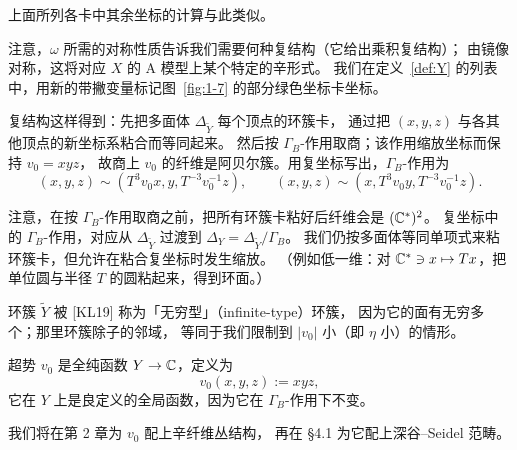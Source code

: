 上面所列各卡中其余坐标的计算与此类似。

\begin{remark}\label{rem:symmetry-told-structure}
注意，$\omega$ 所需的对称性质告诉我们需要何种复结构（它给出乘积复结构）；
由镜像对称，这将对应 $X$ 的 A 模型上某个特定的辛形式。
我们在定义~\ref{def:Y} 的列表中，用新的带撇变量标记图~\ref{fig:1-7} 的部分绿色坐标卡坐标。
\end{remark}

\begin{corollary}[{$Y$ 上的复结构}]\label{cor:complex-structure}
复结构这样得到：先把多面体 $\Delta_{\tilde Y}$ 每个顶点的环簇卡，
通过把 $(x,y,z)$ 与各其他顶点的新坐标系粘合而等同起来。
然后按 $\Gamma_B$-作用取商；该作用缩放坐标而保持 $v_0=xyz$，
故商上 $v_0$ 的纤维是阿贝尔簇。用复坐标写出，$\Gamma_B$-作用为
\[
(x,y,z)\sim(T^3v_0x,y,T^{-3}v_0^{-1}z),\qquad
(x,y,z)\sim(x,T^3v_0y,T^{-3}v_0^{-1}z).
\]
\end{corollary}

\begin{remark}\label{rem:gluing-rescaling}
注意，在按 $\Gamma_B$-作用取商之前，把所有环簇卡粘好后纤维会是 $(\mathbb{C}^*)^2$。
复坐标中的 $\Gamma_B$-作用，对应从 $\Delta_{\tilde Y}$ 过渡到
$\Delta_Y=\Delta_{\tilde Y}/\Gamma_B$。
我们仍按多面体等同单项式来粘环簇卡，但允许在粘合复坐标时发生缩放。
（例如低一维：对 $\mathbb{C}^*\ni x\mapsto Tx$，把单位圆与半径 $T$ 的圆粘起来，得到环面。）
\end{remark}

\begin{remark}[术语]\label{rem:terminology}
环簇 $\tilde Y$ 被 [KL19] 称为「无穷型」（infinite-type）环簇，
因为它的面有无穷多个；那里环簇除子的邻域，
等同于我们限制到 $|v_0|$ 小（即 $\eta$ 小）的情形。
\end{remark}

\begin{definition}[超势]\label{def:superpotential}
超势 $v_0$ 是全纯函数 $Y\to\mathbb{C}$，定义为
\begin{equation}\label{eq:1-15}
v_0(x,y,z):=xyz,
\end{equation}
它在 $Y$ 上是良定义的全局函数，因为它在 $\Gamma_B$-作用下不变。
\end{definition}

\begin{remark}\label{rem:symplectic-fibration}
我们将在第 2 章为 $v_0$ 配上辛纤维丛结构，
再在 §4.1 为它配上深谷–Seidel 范畴。
\end{remark}

